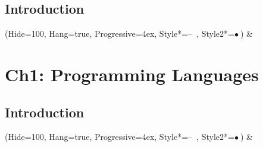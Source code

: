 \documentclass[11pt, oneside]{article}
\begin{document}
\subsection{Introduction}
    \begin{easylist}  
    \ListProperties(Hide=100, Hang=true, Progressive=4ex, Style*=--\ , Style2*=$\bullet\ $)
        & 
    \end{easylist}
\clearpage

\section{Ch1: Programming Languages}
\subsection{Introduction}
    \begin{easylist}  
    \ListProperties(Hide=100, Hang=true, Progressive=4ex, Style*=--\ , Style2*=$\bullet\ $)
        & 
    \end{easylist}
\clearpage
\end{document}

